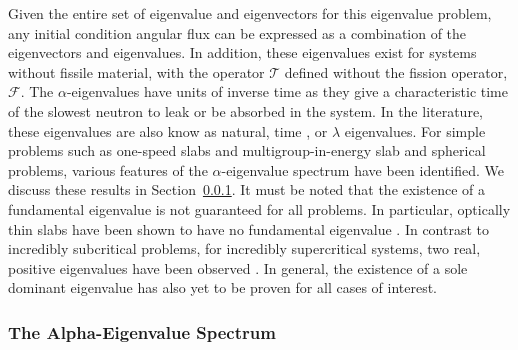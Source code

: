 Given the entire set of eigenvalue and eigenvectors for this eigenvalue problem, any initial condition angular flux can be expressed as a combination of the eigenvectors and eigenvalues. In addition, these eigenvalues exist for systems without fissile material, with the operator $\mathcal{T}$ defined without the fission operator, $\mathcal{F}$. The $\alpha$-eigenvalues have units of inverse time as they give a characteristic time of the slowest neutron to leak or be absorbed in the system. In the literature, these eigenvalues are also know as natural, time \cite{hill_efficient_1983}, or $\lambda$ \cite{duderstadt_nuclear_1976} eigenvalues. For simple problems such as one-speed slabs and multigroup-in-energy slab and spherical problems, various features of the $\alpha$-eigenvalue spectrum have been identified. We discuss these results in Section~\ref{sec:AlphaSpec}. It must be noted that the existence of a fundamental eigenvalue is not guaranteed for all problems. In particular, optically thin slabs have been shown to have no fundamental eigenvalue \cite{kornreich_timeeigenvalue_2005}. In contrast to incredibly subcritical problems, for incredibly supercritical systems, two real, positive eigenvalues have been observed \cite{kornreich_timeeigenvalue_2005}. In general, the existence of a sole dominant eigenvalue has also yet to be proven for all cases of interest.

\subsubsection{The Alpha-Eigenvalue Spectrum}
\label{sec:AlphaSpec}

